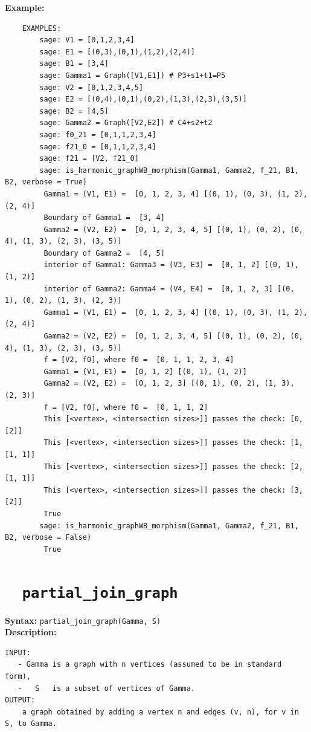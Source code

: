 \documentclass{article}
\begin{document}
\textbf{Example:}
\begin{verbatim}
    EXAMPLES:
        sage: V1 = [0,1,2,3,4]
        sage: E1 = [(0,3),(0,1),(1,2),(2,4)] 
        sage: B1 = [3,4]   
        sage: Gamma1 = Graph([V1,E1]) # P3+s1+t1=P5 
        sage: V2 = [0,1,2,3,4,5]  
        sage: E2 = [(0,4),(0,1),(0,2),(1,3),(2,3),(3,5)] 
        sage: B2 = [4,5]  
        sage: Gamma2 = Graph([V2,E2]) # C4+s2+t2 
        sage: f0_21 = [0,1,1,2,3,4] 
        sage: f21_0 = [0,1,1,2,3,4] 
        sage: f21 = [V2, f21_0] 
        sage: is_harmonic_graphWB_morphism(Gamma1, Gamma2, f_21, B1, B2, verbose = True) 
         Gamma1 = (V1, E1) =  [0, 1, 2, 3, 4] [(0, 1), (0, 3), (1, 2), (2, 4)]
         Boundary of Gamma1 =  [3, 4]
         Gamma2 = (V2, E2) =  [0, 1, 2, 3, 4, 5] [(0, 1), (0, 2), (0, 4), (1, 3), (2, 3), (3, 5)]
         Boundary of Gamma2 =  [4, 5]
         interior of Gamma1: Gamma3 = (V3, E3) =  [0, 1, 2] [(0, 1), (1, 2)]
         interior of Gamma2: Gamma4 = (V4, E4) =  [0, 1, 2, 3] [(0, 1), (0, 2), (1, 3), (2, 3)]
         Gamma1 = (V1, E1) =  [0, 1, 2, 3, 4] [(0, 1), (0, 3), (1, 2), (2, 4)]
         Gamma2 = (V2, E2) =  [0, 1, 2, 3, 4, 5] [(0, 1), (0, 2), (0, 4), (1, 3), (2, 3), (3, 5)]
         f = [V2, f0], where f0 =  [0, 1, 1, 2, 3, 4]
         Gamma1 = (V1, E1) =  [0, 1, 2] [(0, 1), (1, 2)]
         Gamma2 = (V2, E2) =  [0, 1, 2, 3] [(0, 1), (0, 2), (1, 3), (2, 3)]
         f = [V2, f0], where f0 =  [0, 1, 1, 2]
         This [<vertex>, <intersection sizes>]] passes the check: [0, [2]]
         This [<vertex>, <intersection sizes>]] passes the check: [1, [1, 1]]
         This [<vertex>, <intersection sizes>]] passes the check: [2, [1, 1]]
         This [<vertex>, <intersection sizes>]] passes the check: [3, [2]]
         True
        sage: is_harmonic_graphWB_morphism(Gamma1, Gamma2, f_21, B1, B2, verbose = False) 
         True
\end{verbatim}

\section{\tt \ \ partial\_join\_graph}

\textbf{Syntax:} \verb}partial_join_graph(Gamma, S)}\\

\textbf{Description:}
\begin{verbatim}
INPUT:
   - Gamma is a graph with n vertices (assumed to be in standard form),
   -   S   is a subset of vertices of Gamma.
OUTPUT:
    a graph obtained by adding a vertex n and edges (v, n), for v in S, to Gamma.

\end{verbatim}
\end{document}
